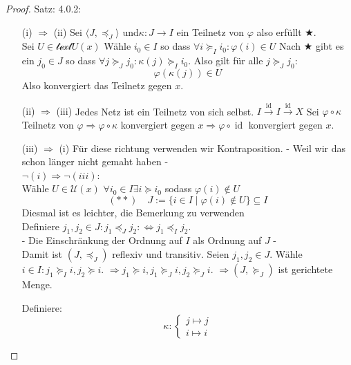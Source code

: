 \begin{proof}{Satz: 4.0.2:}\\
    \begin{itemize}
        \item[ (i) $\Rightarrow$ (ii)]
        Sei $\langle J, \preceq_J \rangle$ und$\kappa : J \to I$ 
        ein Teilnetz von $\varphi$ also erfüllt $\bigstar$.\\
        Sei $U \in \mathscr{text}{U}(x)$
        Wähle $i_0 \in I$ so dass $\forall i \succeq_I i_0 : \varphi(i) \in U$
        Nach $\bigstar$ gibt es ein $j_0 \in J$ so dass 
        $\forall j \succeq_J j_0 : \kappa(j) \succeq_I i_0$.
        Also gilt für alle $j \succeq_J j_0$:
        $$\varphi(\kappa(j)) \in U
        $$
        Also konvergiert das Teilnetz gegen $x$.
        \item[(ii) $\Rightarrow$ (iii)]
        Jedes Netz ist ein Teilnetz von sich selbst. 
        $I \overset{\text{id}}{\longrightarrow} I \overset{\text{id}}{\longrightarrow} X$ 
        Sei $\varphi \circ \kappa$ Teilnetz von 
        $\varphi \Rightarrow \varphi \circ \kappa$ konvergiert gegen 
        $x \Rightarrow \varphi \circ \operatorname{id}$ konvergiert gegen $x$.
        \item[(iii) $\Rightarrow$ (i)]
        Für diese richtung verwenden wir Kontraposition.
        - Weil wir das schon länger nicht gemaht haben -\\
        $\neg (i) \Rightarrow \neg (iii)$:\\
        Wähle $U \in \mathscr{U}(x)$ 
        $\forall i_0 \in I  \exists i \succeq i_0$
        sodass $\varphi(i) \notin U$ 
        $$
        (**)\quad J := \{ i \in I \mid \varphi(i) \notin U \} \subseteq I
        $$
        Diesmal ist es leichter, die Bemerkung zu verwenden\\
        Definiere $j_1, j_2 \in J : j_1 \preceq_J j_2 :\Leftrightarrow j_1 \preceq_I j_2$.\\
        - Die Einschränkung der Ordnung auf $I$ als Ordnung auf $J$ -\\
        Damit ist $(J, \preceq_J)$ reflexiv und transitiv.
\bigskip
        Seien $j_1, j_2 \in J$.
        Wähle $i \in I : j_1 \succeq_I i, j_2 \succeq i$.
        $\Rightarrow j_1 \succeq i, j_1 \succeq_J i, j_2 \succeq_J i$. 
        $\Rightarrow (J, \succeq_J)$ ist gerichtete Menge.

        Definiere:\\
        $$
        \kappa :
        \begin{cases}
        j \mapsto j \\
        i \mapsto i
        \end{cases}
        $$


\end{itemize}
\end{proof}
